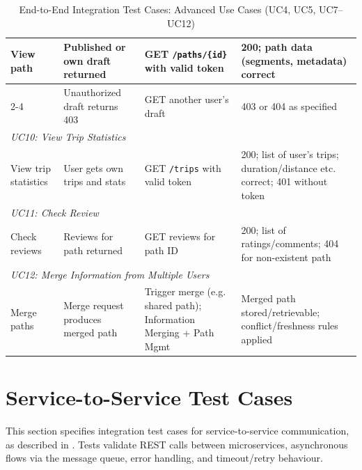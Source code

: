 \begin{table}[ht]
\begin{tabular}{|p{2.4cm}|p{3.4cm}|p{3cm}|p{5.2cm}|}
\hline
\multirow{2}{*}{View path}
 & Published or own draft returned
 & GET \texttt{/paths/\{id\}} with valid token
 & 200; path data (segments, metadata) correct \\ \cline{2-4}
 & Unauthorized draft returns 403
 & GET another user's draft
 & 403 or 404 as specified \\
\hline
\multicolumn{4}{|l|}{\textit{UC10: View Trip Statistics}} \\
\hline
View trip statistics
 & User gets own trips and stats
 & GET \texttt{/trips} with valid token
 & 200; list of user's trips; duration/distance etc. correct; 401 without token \\
\hline
\multicolumn{4}{|l|}{\textit{UC11: Check Review}} \\
\hline
Check reviews
 & Reviews for path returned
 & GET reviews for path ID
 & 200; list of ratings/comments; 404 for non-existent path \\
\hline
\multicolumn{4}{|l|}{\textit{UC12: Merge Information from Multiple Users}} \\
\hline
Merge paths
 & Merge request produces merged path
 & Trigger merge (e.g. shared path); Information Merging + Path Mgmt
 & Merged path stored/retrievable; conflict/freshness rules applied \\
\hline
\end{tabular}
\caption{End-to-End Integration Test Cases: Advanced Use Cases (UC4, UC5, UC7--UC12)}
\label{tab:test_cases_e2e_advanced}
\end{table}

\section{Service-to-Service Test Cases}
\label{sec:service_to_service_test_cases}%

This section specifies integration test cases for service-to-service communication, as described in . Tests validate REST calls between microservices, asynchronous flows via the message queue, error handling, and timeout/retry behaviour.

